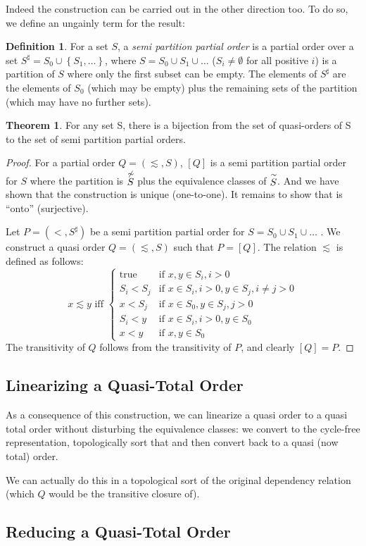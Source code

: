 \documentclass[12pt]{article}
\theoremstyle{definition}
\newtheorem{definition}{Definition}[section]
\theoremstyle{theorem}
\newtheorem{theorem}{Theorem}[section]
\def\aset#1{\left\{{#1}\right\}}
\begin{document}
Indeed the construction can be carried out in the other direction too.
To do so, we define an ungainly term for the result:
\begin{definition}
  For a set $S$, a \emph{semi partition partial order} is a partial
  order over a set \(S^{\sharp} = S_0 \cup \aset{S_1,\ldots}\), where  \(S =
  S_0 \cup S_1 \cup \ldots \) ($S_i\neq \emptyset$ for all
  positive $i$) is a partition of $S$ where only the first subset can
  be empty. The elements of
  \(S^{\sharp}\) are the elements of $S_0$ (which may be empty) plus
  the remaining sets of the partition (which may have no further sets).
\end{definition}
\begin{theorem}
  For any set S, there is a bijection from the set of quasi-orders of
  S to the set of semi partition partial orders.
\end{theorem}
\begin{proof}
  For a partial order $Q=(\lesssim,S)$, $[Q]$ is a semi partition
  partial order for $S$ where the partition is $\stackrel{\not\sim}{S}$ plus
  the equivalence classes of $\stackrel{\sim}{S}$. And we have shown that the
  construction is unique (one-to-one).  It remains to show that is
  ``onto'' (surjective).

  Let $P=(<,S^{\sharp})$ be a semi partition partial order for
  $S = S_0 \cup S_1 \cup \ldots$ .  We
  construct a quasi order $Q=(\lesssim,S)$ such that $P = [Q]$.
  The relation $\lesssim$ is defined as follows:
  \[
  x \lesssim y \textrm{ iff }
  \left\{
  \begin{array}{cl}
    \textrm{true}& \textrm{if } x,y \in S_i, i > 0 \\
    S_i < S_j & \textrm{if } x \in S_i, i > 0, y \in S_j, i \neq j > 0 \\
    x < S_j   & \textrm{if } x \in S_0, y \in S_j, j > 0 \\     
    S_i < y   & \textrm{if } x \in S_i, i > 0, y \in S_0 \\
    x < y     & \textrm{if } x, y \in S_0
  \end{array}\right.
  \]
  The transitivity of $Q$ follows from the transitivity of $P$, and
  clearly $[Q] = P$.
\end{proof}

\subsection{Linearizing a Quasi-Total Order}

As a consequence of this construction, we can linearize a quasi order
to a quasi total order without disturbing the equivalence classes: we
convert to the cycle-free representation, topologically sort that and
then convert back to a quasi (now total) order.

We can actually do this in a topological sort of the original
dependency relation (which $Q$ would be the transitive closure of).

\subsection{Reducing a Quasi-Total Order}
\end{document}
